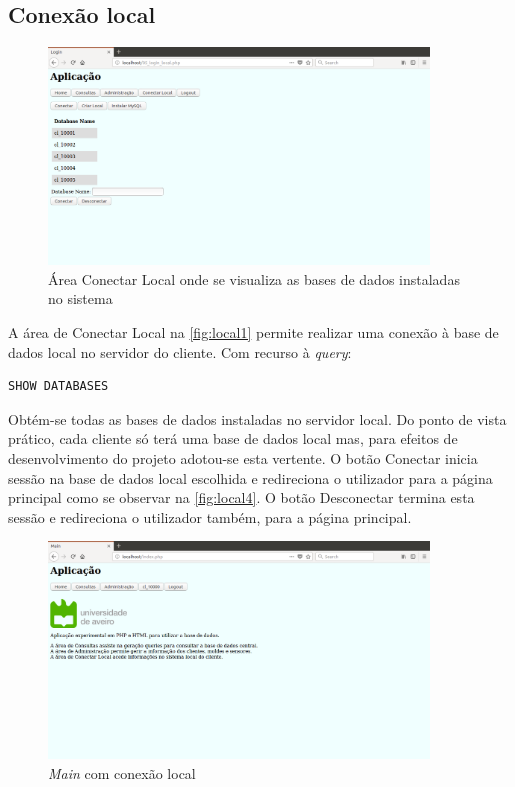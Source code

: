 \documentclass[11pt,twoside,a4paper]{report}
\begin{document}
\subsection{Conexão local}
\label{subchap:local}
	\begin{figure}[H]
		\centering
			\includegraphics[width=0.9\textwidth]{local01} %
			\caption{Área Conectar Local onde se visualiza as bases de dados instaladas no sistema}
			\label{fig:local1}
	\end{figure}
A área de Conectar Local na \autoref{fig:local1} permite realizar uma conexão à base de dados local no servidor do cliente. Com recurso à \textit{query}:
\begin{lstlisting}[language = SQL]
	SHOW DATABASES
\end{lstlisting}
Obtém-se todas as bases de dados instaladas no servidor local. Do ponto de vista prático, cada cliente só terá uma base de dados local mas, para efeitos de desenvolvimento do projeto adotou-se esta vertente.
O botão Conectar inicia sessão na base de dados local escolhida e redireciona o utilizador para a página principal como se observar na \autoref{fig:local4}. O botão Desconectar termina esta sessão e redireciona o utilizador também, para a página principal.
\newpage
\begin{figure}[H]
	\begin{center}
		\includegraphics[width=0.9\textwidth]{main03} %
		\caption{\textit{Main} com conexão local}
		\label{fig:local4}
	\end{center}
\end{figure}
\end{document}
